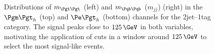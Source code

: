 \begin{figure}
\begin{center}

\end{center}
\caption[Distributions of $m_{\Pgt\Pgt}$ (left) and $m_{jj}$ (right) in the $\mutau$ (top) and
$\etau$ (bottom) channels for the 2jet--1tag category.]{
Distributions of $m_{\Pgt\Pgt}$ (left) and $m_{\Pqb\Pqb}$ ($m_{jj}$) (right) in the $\mutau$ (top) and
$\etau$ (bottom) channels for the 2jet--1tag category. The signal peaks close to
$125\,\GeV$ in both variables, motivating the application of cuts in a window
around $125\,\GeV$ to select the most signal-like events.}
\label{fig:2jet1tagmttmbb}
\end{figure} 

